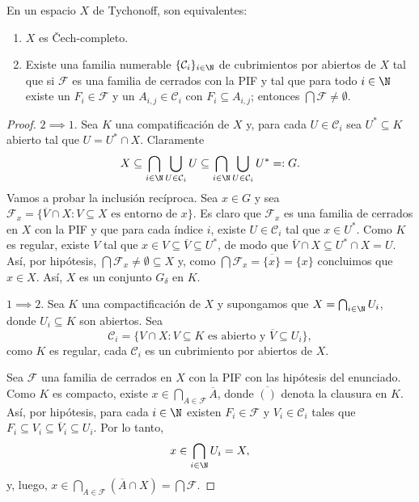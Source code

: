 \documentclass[topologia-analisis.tex]{subfiles}
\begin{document}
\begin{advanced}
\begin{thm}
	En un espacio $X$ de Tychonoff, son equivalentes:
	\begin{enumerate}
		\item $X$ es \v Cech-completo.
		\item Existe una familia numerable $\{ \mathcal{C}_i \}_{i\in\N}$ de cubrimientos por abiertos de $X$
			tal que si $ \mathcal{F} $ es una familia de cerrados con la PIF y tal que para todo $i\in\N$
			existe un $F_i \in \mathcal{F}$ y un $A_{i, j} \in \mathcal{C}_i$ con $F_i \subseteq A_{i, j}$;
			entonces $\bigcap \mathcal{F} \ne \emptyset$.
	\end{enumerate}
\end{thm}
\begin{proof}
	$2 \implies 1$.
	Sea $K$ una compatificación de $X$ y, para cada $U \in \mathcal{C}_i$ sea $U^* \subseteq K$ abierto tal que $U = U^* \cap X$.
	Claramente
	\[
		X \subseteq \bigcap_{i\in\N} \bigcup_{U\in \mathcal{C}_i} U \subseteq \bigcap_{i\in\N} \bigcup_{U\in \mathcal{C}_i} U^* =: G.
	\]
	Vamos a probar la inclusión recíproca.
	Sea $x \in G$ y sea $\mathcal{F}_x = \{ \overline{V} \cap X : V \subseteq X \text{ es entorno de } x \}$.
	Es claro que $\mathcal{F}_x$ es una familia de cerrados en $X$ con la PIF y que para cada índice $i$, existe $U \in \mathcal{C}_i$ tal que $x \in U^*$.
	Como $K$ es regular, existe $V$ tal que $x \in V \subseteq \overline{V} \subseteq U^*$, de modo que $\overline{V} \cap X \subseteq U^* \cap X = U$.
	Así, por hipótesis, $\bigcap \mathcal{F}_x \ne \emptyset \subseteq X$ y, como $\bigcap \mathcal{F}_x = \overline{\{ x \}} = \{ x \}$
	concluimos que $x \in X$. Así, $X$ es un conjunto $G_\delta$ en $K$.

	$1 \implies 2$.
	Sea $K$ una compactificación de $X$ y supongamos que $X = \bigcap_{i\in \N} U_i$, donde $U_i \subseteq K$ son abiertos.
	Sea
	\[
		\mathcal{C}_i = \{ V \cap X : V \subseteq K\text{ es abierto y } \overline{V} \subseteq U_i \},
	\]
	como $K$ es regular, cada $\mathcal{C}_i$ es un cubrimiento por abiertos de $X$.

	Sea $\mathcal{F}$ una familia de cerrados en $X$ con la PIF con las hipótesis del enunciado.
	Como $K$ es compacto, existe $x \in \bigcap_{A \in \mathcal{F}} \overline{A}$, donde $\overline{()}$ denota la clausura en $K$.
	Así, por hipótesis, para cada $i\in \N$ existen $F_i \in \mathcal{F}$ y $V_i \in \mathcal{C}_i$
	tales que $F_i \subseteq V_i \subseteq \overline{V}_i \subseteq U_i$.
	Por lo tanto,
	\[
		x \in \bigcap_{i\in\N} U_i = X,
	\]
	y, luego, $x \in \bigcap_{A \in \mathcal{F}} (\overline{A} \cap X) = \bigcap \mathcal{F}$.
\end{proof}


\end{advanced}
\end{document}
